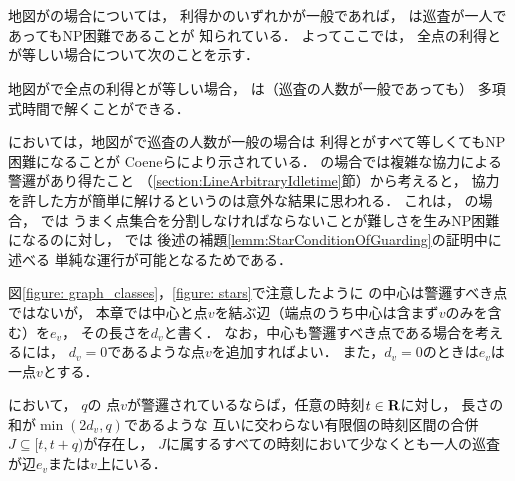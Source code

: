 \chapter{{\graphStar}}
\label{chapter: star}

地図が{\graphStar}の場合については，
利得か{\maxIdletime}のいずれかが一般であれば，
{\patProb}は巡査が一人であってもNP困難であることが
知られている\cite[Theorems 5 and 6]{coene2011charlemagne}．
よってここでは，
全点の利得と{\maxIdletime}が等しい場合について次のことを示す．

\begin{theo}
  \label{theo:StarUnaryProfitAndIdletime}
  地図が{\graphStar}で全点の利得と{\maxIdletime}が等しい場合，
  {\patProb}は（巡査の人数が一般であっても）
  多項式時間で解くことができる．
\end{theo}

{\independentPatProb}においては，地図が{\graphStar}で巡査の人数が一般の場合は
利得と{\maxIdletime}がすべて等しくてもNP困難になることが
Coeneらにより示されている\cite[Theorem~10]{coene2011charlemagne}．
{\graphLine}の場合では複雑な協力による警邏があり得たこと
（\ref{section:LineArbitraryIdletime}節）から考えると，
協力を許した方が簡単に解けるというのは意外な結果に思われる．
これは，
{\graphStar}の場合，
{\independentPatProb}では
うまく点集合を分割しなければならないことが難しさを生みNP困難になるのに対し，
{\patProb}では
後述の補題\ref{lemm:StarConditionOfGuarding}の証明中に述べる
単純な運行が可能となるためである．

図\ref{figure: graph_classes}，\ref{figure: stars}で注意したように
{\graphStar}の中心は警邏すべき点ではないが，
本章では中心と点$v$を結ぶ辺（端点のうち中心は含まず$v$のみを含む）を$e_v$，
その長さを$d_v$と書く．
なお，中心も警邏すべき点である場合を考えるには，
$d_v = 0$であるような点$v$を追加すればよい．
また，$d_v = 0$のときは$e_v$は一点$v$とする．

\begin{lemm}
  \label{lemm:StarCostOfVertex}
  {\graphStar}において，
  {\maxIdletime}$q$の
  点$v$が警邏されているならば，任意の時刻$t \in \mathbf R$に対し，
  長さの和が$\min(2d_v, q)$であるような
  互いに交わらない有限個の時刻区間の合併$J \subseteq [t, t + q)$が存在し，
  $J$に属するすべての時刻において少なくとも一人の巡査が辺$e_v$または$v$上にいる．
\end{lemm}

